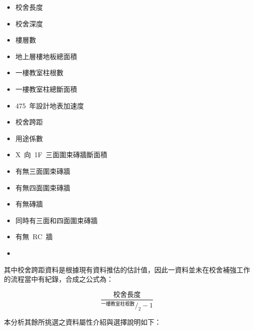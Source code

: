 \begin{multicols}{2}
\begin{itemize}
\item 校舍長度
\item 校舍深度
\item 樓層數
\item 地上層樓地板總面積
\item 一樓教室柱根數
\item 一樓教室柱總斷面積
\item 475~年設計地表加速度
\item 校舍跨距
\item 用途係數
\item X~向~1F~三面圍束磚牆斷面積
\item 有無三面圍束磚牆
\item 有無四面圍束磚牆
\item 有無磚牆
\item 同時有三面和四面圍束磚牆
\item 有無~RC~牆
\item[]
\end{itemize}
\end{multicols}

其中校舍跨距資料是根據現有資料推估的估計值，因此一資料並未在校舍補強工作的流程當中有紀錄，合成之公式為：

\begin{equation} \dfrac{\text{校舍長度}}{^{\text{一樓教室柱根數}}/_2 - 1} \label{eq:span}\end{equation} 

本分析其餘所挑選之資料屬性介紹與選擇說明如下：

